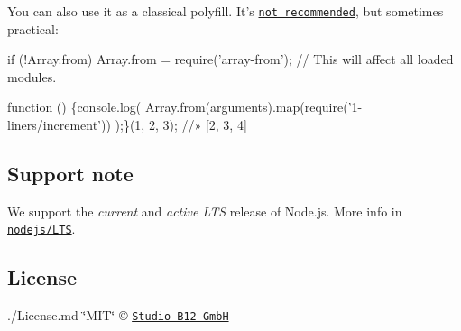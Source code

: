 You can also use it as a classical polyfill. It’s \href{https://github.com/sindresorhus/object-assign/issues/10#issuecomment-65065859}{\tt not recommended}, but sometimes practical\+:


\begin{DoxyCode}
if (!Array.from) Array.from = require('array-from');
  // This will affect all loaded modules.

function () \{console.log(
  Array.from(arguments).map(require('1-liners/increment'))
);\}(1, 2, 3);
//» [2, 3, 4]
\end{DoxyCode}


\subsection*{Support note }

We support the {\itshape current} and {\itshape active L\+TS} release of Node.\+js. More info in \href{https://github.com/nodejs/LTS#lts_schedule}{\tt nodejs/\+L\+TS}.

\subsection*{License }

./\+License.md \char`\"{}\+M\+I\+T\char`\"{} © \href{https://github.com/studio-b12}{\tt Studio B12 GmbH} 